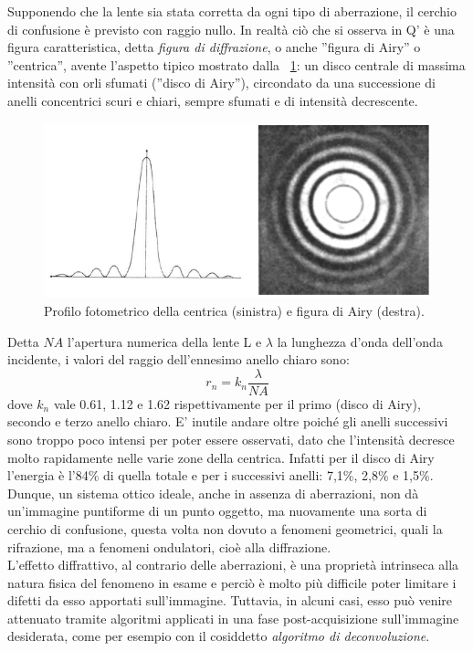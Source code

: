 Supponendo che la lente sia stata corretta da ogni tipo di aberrazione, il cerchio di confusione è previsto con raggio nullo. In realtà ciò che si osserva in Q' è una figura caratteristica, detta \textit{figura di diffrazione}, o anche ''figura di Airy'' o ''centrica'', avente l'aspetto tipico mostrato dalla \figurename~\ref{fig:diff2}: un disco centrale di massima intensità con orli sfumati (''disco di Airy''), circondato da una successione di anelli concentrici scuri e chiari, sempre sfumati e di intensità decrescente.

\begin{figure}[!ht]
 \centering
 \includegraphics[scale=.50]{img/CAP2diff2.png}
 \caption{\small{Profilo fotometrico della centrica (sinistra) e figura di Airy (destra).}}
 \label{fig:diff2}
\end{figure}

Detta $NA$ l'apertura numerica della lente L e $\lambda$ la lunghezza d'onda dell'onda incidente, i valori del raggio dell'ennesimo anello chiaro sono:
$$r_n = k_n \frac{\lambda}{NA} $$
dove $k_n$ vale 0.61, 1.12 e 1.62 rispettivamente per il primo (disco di Airy), secondo e terzo anello chiaro. E' inutile andare oltre poiché gli anelli successivi sono troppo poco intensi per poter essere osservati, dato che l'intensità decresce molto rapidamente nelle varie zone della centrica. Infatti per il  disco di Airy l'energia è l'84\% di quella totale e per i successivi anelli: 7,1\%, 2,8\% e 1,5\%.\\
Dunque, un sistema ottico ideale, anche in assenza di aberrazioni, non dà un'immagine puntiforme di un punto oggetto, ma nuovamente una sorta di cerchio di confusione, questa volta non dovuto a fenomeni geometrici, quali la rifrazione, ma a fenomeni ondulatori, cioè alla diffrazione.\\
L'effetto diffrattivo, al contrario delle aberrazioni, è una proprietà intrinseca alla natura fisica del fenomeno in esame e perciò è molto più difficile poter limitare i difetti da esso apportati sull'immagine. Tuttavia, in alcuni casi, esso può venire attenuato tramite algoritmi applicati in una fase post-acquisizione sull'immagine desiderata, come per esempio con il cosiddetto \textit{algoritmo di deconvoluzione}.

